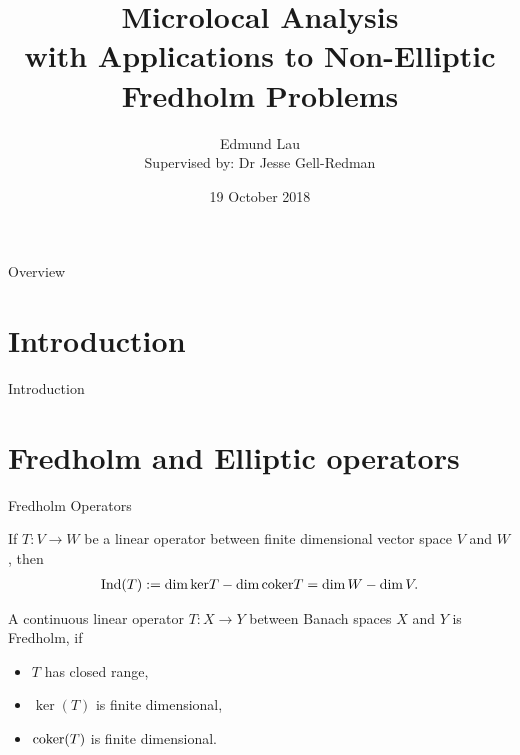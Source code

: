 \documentclass{beamer}
\title{Microlocal Analysis \\ 
    \large with Applications to Non-Elliptic Fredholm Problems}
\author{Edmund Lau \\
Supervised by: Dr Jesse Gell-Redman}
\institute[Unimelb] {
    The University of Melbourne \\ %
    \medskip
    \textit{elau1@student.unimelb.edu.au} %
}
\date{19 October 2018}
\begin{document}
    
\begin{frame}
\titlepage 
\end{frame}


\begin{frame}{Overview}
\tableofcontents
\end{frame}



\section{Introduction} 
\begin{frame}{Introduction}

\end{frame}




\section{Fredholm and Elliptic operators} 
\begin{frame}{Fredholm Operators}

\begin{theorem}
    If $T : V \to W$ be a linear operator between finite dimensional vector space $V$ and $W$, then 
    \begin{align*}
    \mathrm{Ind}(T) := \dim {\mathrm{ker}} T - \dim {\mathrm{coker}} T = \dim W - \dim V. 
    \end{align*}
\end{theorem}

\begin{definition}
    A continuous linear operator $T : X \to Y$ between Banach spaces $X$ and $Y$ is Fredholm, if 
    \begin{itemize}
        \item $T$ has closed range, 
        \item $\ker(T)$ is finite dimensional, 
        \item ${\mathrm{coker}}(T)$ is finite dimensional. 
    \end{itemize}
\end{definition}
\end{frame}
\end{document}
